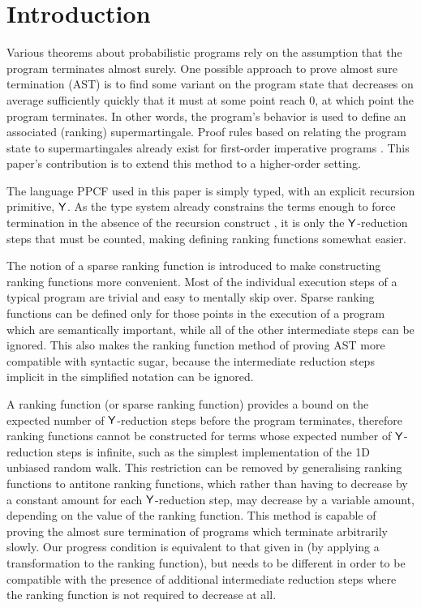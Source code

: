 
\section{Introduction}
\label{sec:intro}

Various theorems about probabilistic programs rely on the assumption that the program terminates almost surely. One possible approach to prove almost sure termination (AST) is to find some variant on the program state that decreases on average sufficiently quickly that it must at some point reach 0, at which point the program terminates. In other words, the program's behavior is used to define an associated (ranking) supermartingale. Proof rules based on relating the program state to supermartingales already exist for first-order imperative programs \cite{DBLP:conf/cav/ChakarovS13,DBLP:conf/popl/FioritiH15,DBLP:journals/pacmpl/McIverMKK18}. This paper's contribution is to extend this method to a higher-order setting.

The language PPCF used in this paper is simply typed, with an explicit recursion primitive, $\mathsf{Y}$. As the type system already constrains the terms enough to force termination in the absence of the recursion construct \cite{tait1967,BarendregtDS2010}, it is only the $\mathsf{Y}$-reduction steps that must be counted, making defining ranking functions somewhat easier.

The notion of a sparse ranking function is introduced to make constructing ranking functions more convenient. Most of the individual execution steps of a typical program are trivial and easy to mentally skip over. Sparse ranking functions can be defined only for those points in the execution of a program which are semantically important, while all of the other intermediate steps can be ignored. This also makes the ranking function method of proving AST more compatible with syntactic sugar, because the intermediate reduction steps implicit in the simplified notation can be ignored.

A ranking function (or sparse ranking function) provides a bound on the expected number of $\mathsf{Y}$-reduction steps before the program terminates, therefore ranking functions cannot be constructed for terms whose expected number of $\mathsf{Y}$-reduction steps is infinite, such as the simplest implementation of the 1D unbiased random walk. This restriction can be removed by generalising ranking functions to antitone ranking functions, which rather than having to decrease by a constant amount for each $\mathsf{Y}$-reduction step, may decrease by a variable amount, depending on the value of the ranking function. This method is capable of proving the almost sure termination of programs which terminate arbitrarily slowly. Our progress condition is equivalent to that given in \cite{DBLP:journals/pacmpl/McIverMKK18} (by applying a transformation to the ranking function), but needs to be different in order to be compatible with the presence of additional intermediate reduction steps where the ranking function is not required to decrease at all.

